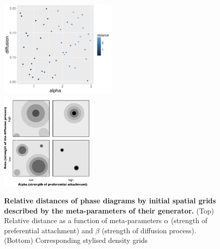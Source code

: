 \documentclass[Afour,sageh,times]{sagej}
\begin{document}
\begin{figure}
\centering
\includegraphics[width=0.5\textwidth]{figures/relativedistance_metaparams}\\
\includegraphics[width=0.4\textwidth]{figures/alpha_beta_schemas}\\
\caption{\textbf{Relative distances of phase diagrams by initial spatial grids described by the meta-parameters of their generator.} (Top) Relative distance as a function of meta-parameters $\alpha$ (strength of preferential attachment) and $\beta$ (strength of diffusion process).  (Bottom) Corresponding stylised density grids }
\label{fig:sugarscape-distance-meta}
\end{figure}
\end{document}
